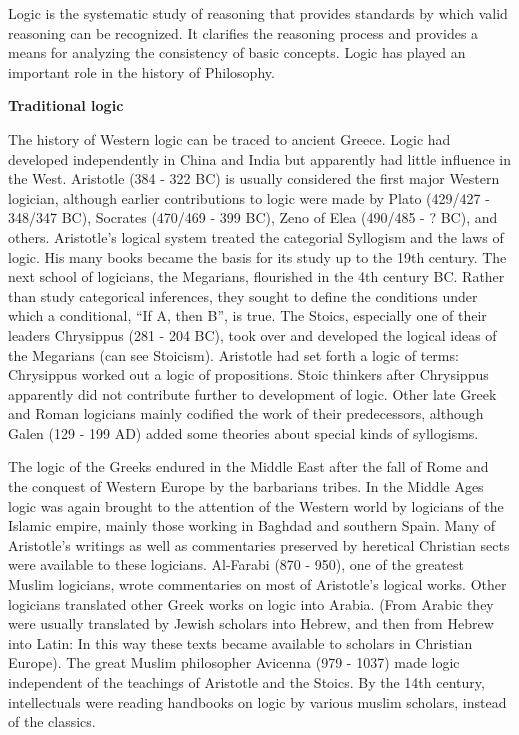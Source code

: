 \documentclass{article}
\begin{document}
    Logic is the systematic study of reasoning that provides standards by which valid reasoning can be recognized. It clarifies the reasoning process and provides a means for analyzing the consistency of basic concepts. Logic has played an important role in the history of Philosophy. \par
    
    \begin{center}
        \large\textbf{{Traditional logic}} 
    \end{center}
    
    The history of Western logic can be traced to ancient Greece. Logic had developed independently in China and India but apparently had little influence in the West. Aristotle (384 - 322 BC) is usually considered the first major Western logician, although earlier contributions to logic were made by Plato (429/427 - 348/347 BC), Socrates (470/469 - 399 BC), Zeno of Elea (490/485 - ? BC), and others. Aristotle's logical system treated the categorial Syllogism and the laws of logic. His many books became the basis for its study up to the 19th century. The next school of logicians, the Megarians, flourished in the 4th century BC. Rather than study categorical inferences, they sought to define the conditions under which a conditional, ``If A, then B'', is true. The Stoics, especially one of their leaders Chrysippus (281 - 204 BC), took over and developed the logical ideas of the Megarians (can see Stoicism). Aristotle had set forth a logic of terms: Chrysippus worked out a logic of propositions. Stoic thinkers after Chrysippus apparently did not contribute further to development of logic. Other late Greek and Roman logicians mainly codified the work of their predecessors, although Galen (129 - 199 AD) added some theories about special kinds of syllogisms. \par
    
    The logic of the Greeks endured in the Middle East after the fall of Rome and the conquest of Western Europe by the barbarians tribes. In the Middle Ages logic was again brought to the attention of the Western world by logicians of the Islamic empire, mainly those working in Baghdad and southern Spain. Many of Aristotle's writings as well as commentaries preserved by heretical Christian sects were available to these logicians. Al-Farabi (870 - 950), one of the greatest Muslim logicians, wrote commentaries on most of Aristotle's logical works. Other logicians translated other Greek works on logic into Arabia. (From Arabic they were usually translated by Jewish scholars into Hebrew, and then from Hebrew into Latin: In this way these texts became available to scholars in Christian Europe). The great Muslim philosopher Avicenna (979 - 1037) made logic independent of the teachings of Aristotle and the Stoics. By the 14th century, intellectuals were reading handbooks on logic by various muslim scholars, instead of the classics. \par
    
\end{document}
